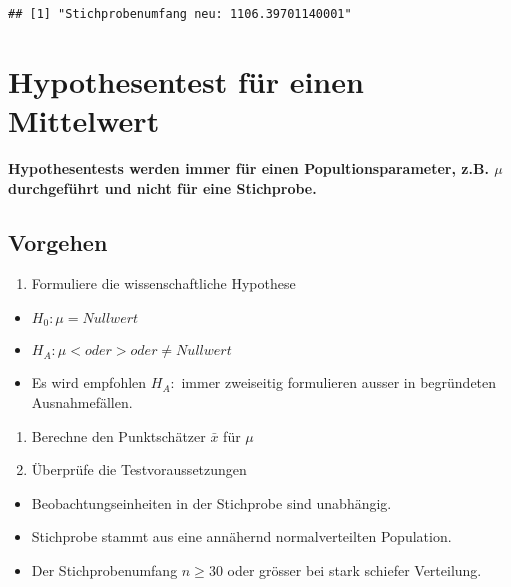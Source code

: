\documentclass[
]{book}
\providecommand{\tightlist}{%
  \setlength{\itemsep}{0pt}\setlength{\parskip}{0pt}}
\begin{document}
\begin{verbatim}
## [1] "Stichprobenumfang neu: 1106.39701140001"
\end{verbatim}

\hypertarget{hypothesentest-fuxfcr-einen-mittelwert}{%
\section{Hypothesentest für einen Mittelwert}\label{hypothesentest-fuxfcr-einen-mittelwert}}

\textbf{Hypothesentests werden immer für einen Popultionsparameter, z.B. \(\mu\) durchgeführt und nicht für eine Stichprobe.}

\hypertarget{vorgehen}{%
\subsection{Vorgehen}\label{vorgehen}}

\begin{enumerate}
\def\labelenumi{\arabic{enumi}.}
\tightlist
\item
  Formuliere die wissenschaftliche Hypothese
\end{enumerate}

\begin{itemize}
\tightlist
\item
  \(H_0: \mu = Nullwert\)\\
\item
  \(H_A: \mu < oder > oder \neq Nullwert\)\\
\item
  Es wird empfohlen \(H_A:\) immer zweiseitig formulieren ausser in begründeten Ausnahmefällen.
\end{itemize}

\begin{enumerate}
\def\labelenumi{\arabic{enumi}.}
\setcounter{enumi}{1}
\tightlist
\item
  Berechne den Punktschätzer \(\bar{x}\) für \(\mu\)\\
\item
  Überprüfe die Testvoraussetzungen
\end{enumerate}

\begin{itemize}
\tightlist
\item
  Beobachtungseinheiten in der Stichprobe sind unabhängig.\\
\item
  Stichprobe stammt aus eine annähernd normalverteilten Population.\\
\item
  Der Stichprobenumfang \(n \geq 30\) oder grösser bei stark schiefer Verteilung.
\end{itemize}
\end{document}
